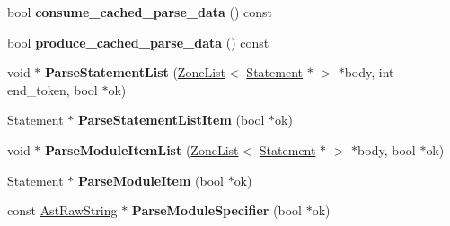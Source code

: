 \begin{DoxyCompactItemize}
\item 
bool {\bfseries consume\+\_\+cached\+\_\+parse\+\_\+data} () const \hypertarget{classv8_1_1internal_1_1_parser_ae4c82eaa4e19ffb0eb9757b6a0b83b5c}{}\label{classv8_1_1internal_1_1_parser_ae4c82eaa4e19ffb0eb9757b6a0b83b5c}

\item 
bool {\bfseries produce\+\_\+cached\+\_\+parse\+\_\+data} () const \hypertarget{classv8_1_1internal_1_1_parser_ab93140300206657b2b09549446fc0083}{}\label{classv8_1_1internal_1_1_parser_ab93140300206657b2b09549446fc0083}

\item 
void $\ast$ {\bfseries Parse\+Statement\+List} (\hyperlink{classv8_1_1internal_1_1_zone_list}{Zone\+List}$<$ \hyperlink{classv8_1_1internal_1_1_statement}{Statement} $\ast$ $>$ $\ast$body, int end\+\_\+token, bool $\ast$ok)\hypertarget{classv8_1_1internal_1_1_parser_a8fa3d6c86dfb636ecb4e5171b9b9d71d}{}\label{classv8_1_1internal_1_1_parser_a8fa3d6c86dfb636ecb4e5171b9b9d71d}

\item 
\hyperlink{classv8_1_1internal_1_1_statement}{Statement} $\ast$ {\bfseries Parse\+Statement\+List\+Item} (bool $\ast$ok)\hypertarget{classv8_1_1internal_1_1_parser_ac09b0ed3c8eeb3d2faaa5cda3abca119}{}\label{classv8_1_1internal_1_1_parser_ac09b0ed3c8eeb3d2faaa5cda3abca119}

\item 
void $\ast$ {\bfseries Parse\+Module\+Item\+List} (\hyperlink{classv8_1_1internal_1_1_zone_list}{Zone\+List}$<$ \hyperlink{classv8_1_1internal_1_1_statement}{Statement} $\ast$ $>$ $\ast$body, bool $\ast$ok)\hypertarget{classv8_1_1internal_1_1_parser_af09dbac230e94722bea2ce23b167ea2e}{}\label{classv8_1_1internal_1_1_parser_af09dbac230e94722bea2ce23b167ea2e}

\item 
\hyperlink{classv8_1_1internal_1_1_statement}{Statement} $\ast$ {\bfseries Parse\+Module\+Item} (bool $\ast$ok)\hypertarget{classv8_1_1internal_1_1_parser_ae6767361c7f84c9c029f37594a21cc6d}{}\label{classv8_1_1internal_1_1_parser_ae6767361c7f84c9c029f37594a21cc6d}

\item 
const \hyperlink{classv8_1_1internal_1_1_ast_raw_string}{Ast\+Raw\+String} $\ast$ {\bfseries Parse\+Module\+Specifier} (bool $\ast$ok)\hypertarget{classv8_1_1internal_1_1_parser_a8400c1bc16f3940838d23d5fab2c4512}{}\label{classv8_1_1internal_1_1_parser_a8400c1bc16f3940838d23d5fab2c4512}


\end{DoxyCompactItemize}
